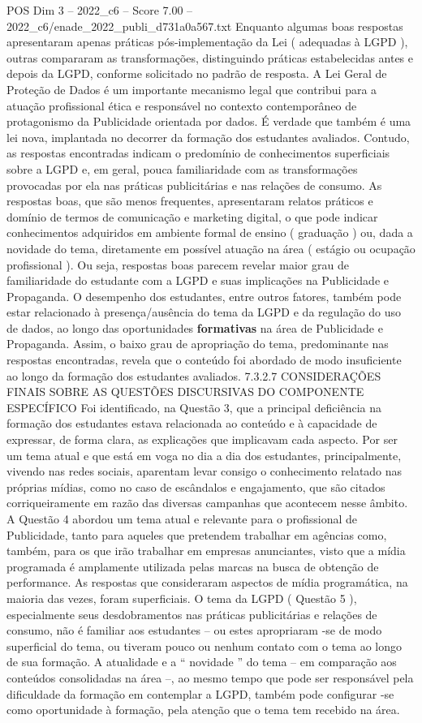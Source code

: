 \begin{textsample}{POS Dim 3 – 2022\_c6 – Score 7.00 – 2022\_c6/enade\_2022\_publi\_d731a0a567.txt}
Enquanto algumas boas respostas apresentaram apenas práticas pós-implementação da Lei ( adequadas à LGPD ), outras compararam as transformações, distinguindo práticas estabelecidas antes e depois da LGPD, conforme solicitado no padrão de resposta.
A Lei Geral de Proteção de Dados é um importante mecanismo legal que contribui para a atuação profissional ética e responsável no contexto contemporâneo de protagonismo da Publicidade orientada por dados.
É verdade que também é uma lei nova, implantada no decorrer da formação dos estudantes avaliados.
Contudo, as respostas encontradas indicam o predomínio de conhecimentos superficiais sobre a LGPD e, em geral, pouca familiaridade com as transformações provocadas por ela nas práticas publicitárias e nas relações de consumo.
As respostas boas, que são menos frequentes, apresentaram relatos práticos e domínio de termos de comunicação e marketing digital, o que pode indicar conhecimentos adquiridos em ambiente formal de ensino ( graduação ) ou, dada a novidade do tema, diretamente em possível atuação na área ( estágio ou ocupação profissional ).
Ou seja, respostas boas parecem revelar maior grau de familiaridade do estudante com a LGPD e suas implicações na Publicidade e Propaganda.
O desempenho dos estudantes, entre outros fatores, também pode estar relacionado à presença/ausência do tema da LGPD e da regulação do uso de dados, ao longo das oportunidades \textbf{formativas} na área de Publicidade e Propaganda.
Assim, o baixo grau de apropriação do tema, predominante nas respostas encontradas, revela que o conteúdo foi abordado de modo insuficiente ao longo da formação dos estudantes avaliados. 7.3.2.7 CONSIDERAÇÕES FINAIS SOBRE AS QUESTÕES DISCURSIVAS DO COMPONENTE ESPECÍFICO Foi identificado, na Questão 3, que a principal deficiência na formação dos estudantes estava relacionada ao conteúdo e à capacidade de expressar, de forma clara, as explicações que implicavam cada aspecto.
Por ser um tema atual e que está em voga no dia a dia dos estudantes, principalmente, vivendo nas redes sociais, aparentam levar consigo o conhecimento relatado nas próprias mídias, como no caso de escândalos e engajamento, que são citados corriqueiramente em razão das diversas campanhas que acontecem nesse âmbito.
A Questão 4 abordou um tema atual e relevante para o profissional de Publicidade, tanto para aqueles que pretendem trabalhar em agências como, também, para os que irão trabalhar em empresas anunciantes, visto que a mídia programada é amplamente utilizada pelas marcas na busca de obtenção de performance.
As respostas que consideraram aspectos de mídia programática, na maioria das vezes, foram superficiais.
O tema da LGPD ( Questão 5 ), especialmente seus desdobramentos nas práticas publicitárias e relações de consumo, não é familiar aos estudantes – ou estes apropriaram -se de modo superficial do tema, ou tiveram pouco ou nenhum contato com o tema ao longo de sua formação.
A atualidade e a “ novidade ” do tema – em comparação aos conteúdos consolidadas na área –, ao mesmo tempo que pode ser responsável pela dificuldade da formação em contemplar a LGPD, também pode configurar -se como oportunidade à formação, pela atenção que o tema tem recebido na área.


\end{textsample}
